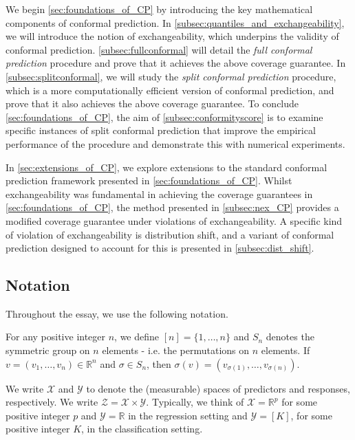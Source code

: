 \documentclass[11pt, titlepage]{article} %
\numberwithin{equation}{section}
\theoremstyle{definition}
\numberwithin{theorem}{section}
\numberwithin{lemma}{section}
\numberwithin{corollary}{section}
\numberwithin{proposition}{section}
\numberwithin{definition}{section}
\numberwithin{remark}{section}
\begin{document}
\noindent
We begin \cref{sec:foundations_of_CP} by introducing the key mathematical components of conformal prediction. In \cref{subsec:quantiles_and_exchangeability}, we will introduce the notion of exchangeability, which underpins the validity of conformal prediction. \cref{subsec:fullconformal} will detail the \textit{full conformal prediction} procedure and prove that it achieves the above coverage guarantee. In \cref{subsec:splitconformal}, we will study the \textit{split conformal prediction} procedure, which is a more computationally efficient version of conformal prediction, and prove that it also achieves the above coverage guarantee. To conclude \cref{sec:foundations_of_CP}, the aim of \cref{subsec:conformityscore} is to examine specific instances of split conformal prediction that improve the empirical performance of the procedure and demonstrate this with numerical experiments. \vskip5pt

\noindent
In \cref{sec:extensions_of_CP}, we explore extensions to the standard conformal prediction framework presented in \cref{sec:foundations_of_CP}. Whilst exchangeability was fundamental in achieving the coverage guarantees in \cref{sec:foundations_of_CP}, the method presented in \cref{subsec:nex_CP} provides a modified coverage guarantee under violations of exchangeability. A specific kind of violation of exchangeability is distribution shift, and a variant of conformal prediction designed to account for this is presented in \cref{subsec:dist_shift}.

\subsection{Notation}

Throughout the essay, we use the following notation.  \vskip5pt

\noindent
For any positive integer \(n\), we define \([n] = \{1, \ldots, n\}\) and \(S_n\) denotes the symmetric group on \(n\) elements - i.e. the permutations on \(n\) elements. If \(v = (v_1, \ldots, v_n) \in \mathbb{R}^n\) and \(\sigma \in S_n\), then \(\sigma(v) = (v_{\sigma(1)}, \ldots, v_{\sigma(n)}).\) \vskip5pt

\noindent
We write \(\mathcal{X}\) and \(\mathcal{Y}\) to denote the (measurable) spaces of predictors and responses, respectively. We write \(\mathcal{Z} = \mathcal{X} \times \mathcal{Y}.\) Typically, we think of \(\mathcal{X} = \mathbb{R}^p\) for some positive integer \(p\) and \(\mathcal{Y} = \mathbb{R}\) in the regression setting and \(\mathcal{Y} = [K]\), for some positive integer \(K\), in the classification setting.
\end{document}
